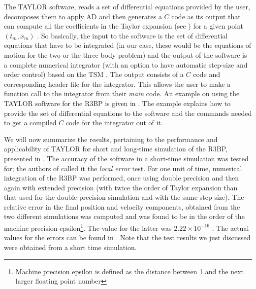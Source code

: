 The TAYLOR software, reads a set of differential equations provided by the user, decomposes them to apply \gls{AD} and then generates a $C$ code as its output that can compute all the coefficients in the Taylor expansion (see ) for a given point $(t_m, x_m)$ \cite{taylorSoftware}. So basically, the input to the software is the set of differential equations that have to be integrated (in our case, these would be the equations of motion for the two or the three-body problem) and the output of the software is a complete numerical integrator (with an option to have automatic step-size and order control) based on the \gls{TSM} \cite{taylorSoftware}. The output consists of a $C$ code and corresponding header file for the integrator. This allows the user to make a function call to the integrator from their \textit{main} code. An example on using the TAYLOR software for the \gls{R3BP} is given in \cite{taylorSoftware}. The example explains how to provide the set of differential equations to the software and the commands needed to get a compiled $C$ code for the integrator out of it.

We will now summarize the results, pertaining to the performance and applicability of TAYLOR for short and long-time simulation of the \gls{R3BP}, presented in \cite{taylorSoftware}. The accuracy of the software in a short-time simulation was tested for; the authors of \cite{taylorSoftware} called it the \textit{local error} test. For one unit of time, numerical integration of the \gls{R3BP} was performed, once using double precision and then again with extended precision (with twice the order of Taylor expansion than that used for the double precision simulation and with the same step-size). The relative error in the final position and velocity components, obtained from the two different simulations was computed and was found to be in the order of the machine precision epsilon\footnote{Machine precision epsilon is defined as the distance between 1 and the next larger floating point number}. The value for the latter was $2.22 \times 10^{-16}$ \cite{taylorSoftware}. The actual values for the errors can be found in \cite{taylorSoftware}. Note that the test results we just discussed were obtained from a short time simulation.

